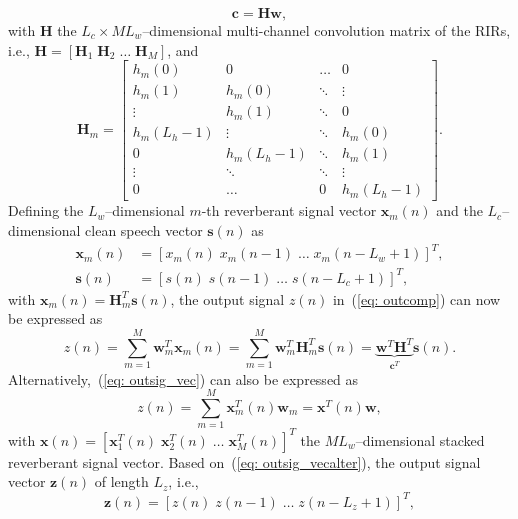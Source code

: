 \documentclass[10pt]{IEEEtran}
\begin{document}
\begin{equation}
\label{eq: eir}
\mathbf{c} = \mathbf{H}\mathbf{w},
\end{equation}
with $\mathbf{H}$ the $L_c \times ML_w$--dimensional multi-channel convolution matrix of the RIRs, i.e., $\mathbf{H}  = [\mathbf{H}_1 \; \mathbf{H}_2 \; \ldots \; \mathbf{H}_M]$, and
\begin{equation}
\mathbf{H}_m \! = \! \begin{bmatrix}
    h_m(0) & 0 &  \ldots & 0 \\
    h_m(1) & h_m(0) & \ddots & \vdots \\
    \vdots & h_m(1) & \ddots & 0 \\
    h_m(L_h\!-\!1) & \vdots & \ddots & h_m(0) \\
    0 & h_m(L_h\!-\!1) & \ddots & h_m(1) \\
    \vdots & \ddots & \ddots & \vdots \\
    0 & \ldots & 0 & h_m(L_h\!-\!1)
   \end{bmatrix}.
 \end{equation}
Defining the $L_w$--dimensional $m$-th reverberant signal vector $\mathbf{x}_m(n)$ and the $L_c$--dimensional clean speech vector $\mathbf{s}(n)$ as
\begin{align}
\mathbf{x}_m(n) & = [x_m(n) \; x_m(n-1) \; \ldots \; x_m(n-L_w+1)]^T, \\
\mathbf{s}(n) & = [s(n) \; s(n-1) \; \ldots \; s(n-L_c+1)]^T,
\end{align}
with $\mathbf{x}_m(n) = \mathbf{H}_m^T \mathbf{s}(n)$, the output signal $z(n)$ in~(\ref{eq: outcomp}) can now be expressed as
\begin{equation}
\label{eq: outsig_vec}
z(n) = \sum_{m=1}^M \mathbf{w}_m^T\mathbf{x}_m(n) = \sum_{m=1}^M \mathbf{w}_m^T\mathbf{H}^T_m\mathbf{s}(n) = \underbrace{\mathbf{w}^T\mathbf{H}^T}_{\mathbf{c}^T}\mathbf{s}(n).
\end{equation}
Alternatively,~(\ref{eq: outsig_vec}) can also be expressed as
\begin{equation}
\label{eq: outsig_vecalter}
z(n) = \sum_{m=1}^M \mathbf{x}_m^T(n)\mathbf{w}_m = \mathbf{x}^T(n)\mathbf{w},
\end{equation}
with $\mathbf{x}(n) = [\mathbf{x}^T_1(n) \; \mathbf{x}^T_2(n) \; \ldots \; \mathbf{x}^T_M(n)]^T$ the $ML_w$--dimensional stacked reverberant signal vector.
Based on~(\ref{eq: outsig_vecalter}), the output signal vector $\mathbf{z}(n)$ of length $L_z$, i.e., 
\begin{equation}
\label{out_vec}
\mathbf{z}(n) = [z(n) \; z(n-1) \; \ldots \; z(n-L_z+1)]^T,
\end{equation}
\end{document}
